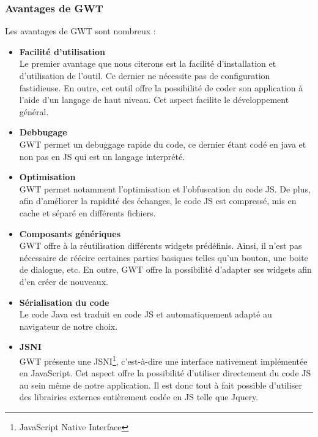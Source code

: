 \subsubsection{Avantages de GWT}

Les avantages de GWT sont nombreux :  \\
\begin{itemize}
\item \textbf{Facilité d'utilisation}\\
Le premier avantage que nous citerons est la facilité d'installation et d'utilisation de l'outil. Ce dernier ne nécessite pas de configuration fastidieuse. En outre, cet outil offre la possibilité de coder son application à l'aide d'un langage de haut niveau. Cet aspect facilite le développement général.\\

\item \textbf{Debbugage}\\
GWT permet un debuggage rapide du code, ce dernier étant codé en java et non pas en JS qui est un langage interprété.\\

\item \textbf{Optimisation}\\
GWT permet notamment l'optimisation et l'obfuscation du code JS. De plus, afin d'améliorer la rapidité des échanges, le code JS est compressé, mis en cache et séparé en différents fichiers.\\

\item \textbf{Composants génériques}\\
GWT offre à la réutilisation différents widgets prédéfinis. Ainsi, il n'est pas nécessaire de réécire certaines parties basiques telles qu'un bouton, une boite de dialogue, etc.  En outre, GWT offre la possibilité d'adapter ses widgets afin d'en créer de nouveaux.\\

\item \textbf{Sérialisation du code}\\
Le code Java est traduit en code JS et automatiquement adapté au navigateur de notre choix.\\

\item \textbf{JSNI}\\
GWT présente une JSNI\footnote{JavaScript Native Interface}, c'est-à-dire une interface nativement implémentée en JavaScript. Cet aspect offre la possibilité d'utiliser directement du code JS au sein même de notre application. Il est donc tout à fait possible d'utiliser des librairies externes entièrement codée en JS telle que Jquery.\\


\end{itemize}
